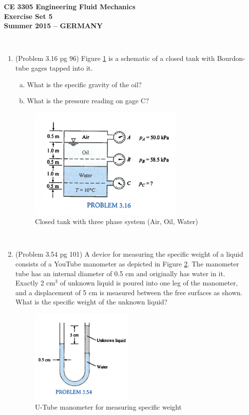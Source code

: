 \documentclass[12pt]{article}
\begin{document}
\begingroup
\begin{center}
{\textbf{{ CE 3305 Engineering Fluid Mechanics} \\ Exercise Set 5 \\ Summer 2015 -- GERMANY} }
\end{center}
\endgroup
\begingroup
~\newline

\begin{enumerate}
\item (Problem 3.16 pg 96)
Figure \ref{fig:AirOilWaterTank} is a schematic of a closed tank with Bourdon-tube gages tapped into it.   
\begin{enumerate}[a)]
\item What is the specific gravity of the oil?
\item What is the pressure reading on gage C?
\end{enumerate}
\begin{figure}[htbp] %
   \centering
   \includegraphics[width=3in]{AirOilWaterTank.jpg} 
   \caption{Closed tank with three phase system (Air, Oil, Water)}
   \label{fig:AirOilWaterTank}
\end{figure}
\clearpage
~
\clearpage
\item (Problem 3.54 pg 101)
A device for measuring the specific weight of a liquid consists of a YouTube manometer as depicted in Figure \ref{fig:YouTubeManometer}.
The manometer tube has an internal diameter of 0.5 cm and originally has water in it.
Exactly 2 cm$^3$ of unknown liquid is poured into one leg of the manometer, and a displacement of 5 cm is measured between the free surfaces as shown.  What is the specific weight of the unknown liquid?
\begin{figure}[htbp] %
   \centering
   \includegraphics[width=2in]{YouTubeManometer.jpg} 
   \caption{U-Tube manometer for measuring specific weight}
   \label{fig:YouTubeManometer}
\end{figure}
\clearpage
~
\end{enumerate}
\end{document}
